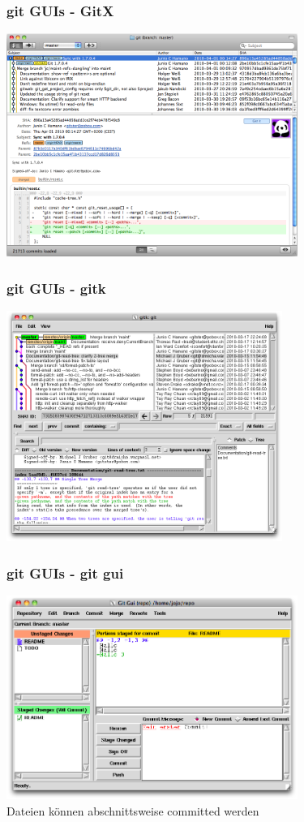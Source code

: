 \begin{frame}
  \frametitle{git GUIs - GitX}
  \vspace{-0.3cm}
  \begin{center}
    \includegraphics[width=9.5cm]{img/gitx.png}
  \end{center}
\end{frame}

\begin{frame}
  \frametitle{git GUIs - gitk}
  \vspace{-0.3cm}
  \begin{center}
    \includegraphics[width=9.0cm]{img/gitk.png}
  \end{center}
\end{frame}

\begin{frame}
  \frametitle{git GUIs - git gui}
  \vspace{-0.3cm}
  \begin{center}
    \includegraphics[width=9.5cm]{img/git_gui.png} \\
    Dateien können abschnittsweise committed werden
  \end{center}
\end{frame}

